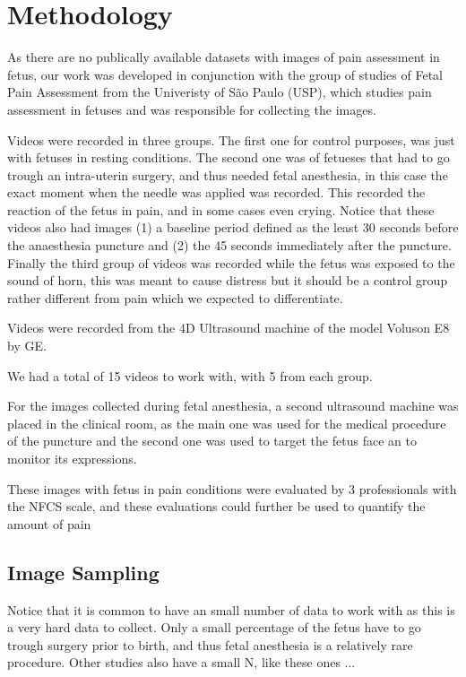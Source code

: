 \chapter{Methodology}

As there are no publically available datasets with images of pain assessment in fetus, our work was developed in conjunction with the group of studies of Fetal Pain Assessment from the Univeristy of São Paulo (USP), which studies pain assessment in fetuses and was responsible for collecting the images.

Videos were recorded in three groups. The first one for control purposes, was just with fetuses in resting conditions. The second one was of fetueses that had to go trough an intra-uterin surgery, and thus needed fetal anesthesia, in this case the exact moment when the needle was applied was recorded. This recorded the reaction of the fetus in pain, and in some cases even crying. Notice that these videos also had images (1) a baseline period defined as the least 30 seconds before the anaesthesia puncture and (2) the 45 seconds immediately after the puncture. Finally the third group of videos was recorded while the fetus was exposed to the sound of horn, this was meant to cause distress but it should be a control group rather different from pain which we expected to differentiate.

Videos were recorded from the 4D Ultrasound machine of the model Voluson E8 by GE. 

We had a total of 15 videos to work with, with 5 from each group.

For the images collected during fetal anesthesia, a second ultrasound machine was placed in the clinical room, as the main one was used for the medical procedure of the puncture and the second one was used to target the fetus face an to monitor its expressions.

These images with fetus in pain conditions were evaluated by 3 professionals with the NFCS scale, and these evaluations could further be used to quantify the amount of pain 

\section{Image Sampling}

Notice that it is common to have an small number of data to work with as this is a very hard data to collect. Only a small percentage of the fetus have to go trough surgery prior to birth, and thus fetal anesthesia is a relatively rare procedure. Other studies also have a small N, like these ones ... 

